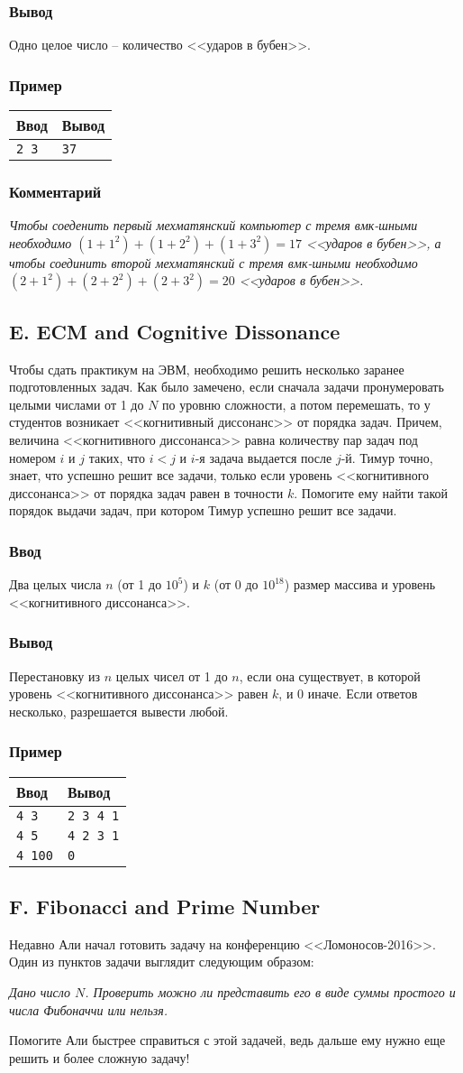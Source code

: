 \documentclass[10pt, a4paper]{article}
\newcommand{\informat}[1]
{
	\subsubsection*{Ввод} #1
}
\newcommand{\outformat}[1]
{
	\subsubsection*{Вывод} #1
}
\newcommand{\example}[2]
{
	\subsubsection*{Пример}
	\noindent
	\begin{center}
	\begin{tabularx}{\linewidth}{|X|X|}
	\hline
	Ввод & Вывод \\
	\hline
	{\tt #1} & {\tt #2}		\\
	\hline
	\end{tabularx}
	\end{center}
}
\newcommand{\exampleee}[6]
{
	\subsubsection*{Пример}
	\noindent
	\begin{center}
	\begin{tabularx}{\linewidth}{|X|X|}
	\hline
	Ввод 	& Вывод  	\\
	\hline
	{\tt #1} & {\tt #2}	\\
	\hline
	{\tt #3} & {\tt #4}	\\
	\hline
	{\tt #5} & {\tt #6}	\\
	\hline
	\end{tabularx}
	\end{center}
}
\newcommand{\excomm}[1]
{
	\subsubsection*{Комментарий}
	\textit{#1}
}
\begin{document}
\outformat{Одно целое число -- количество <<ударов в бубен>>.}

\example{2 3}{37}

\excomm{Чтобы соеденить первый мехматянский компьютер с тремя вмк-шными необходимо $(1+1^2) + (1+2^2) + (1+3^2) = 17$ <<ударов в бубен>>, а чтобы соединить второй мехматянский с тремя вмк-шными необходимо $(2+1^2) + (2+2^2) + (2+3^2) = 20$ <<ударов в бубен>>.}



\subsection*{E. ECM and Cognitive Dissonance}

Чтобы сдать практикум на ЭВМ, необходимо решить несколько заранее подготовленных задач. Как было замечено, если сначала задачи пронумеровать целыми числами от 1 до $N$ по уровню сложности, а потом перемешать, то у студентов возникает <<когнитивный диссонанс>> от порядка задач. Причем, величина <<когнитивного диссонанса>> равна количеству пар задач под номером $i$ и $j$ таких, что $i < j$ и $i$-я задача выдается после $j$-й. Тимур точно, знает, что успешно решит все задачи, только если уровень <<когнитивного диссонанса>> от порядка задач равен в точности $k$. Помогите ему найти такой порядок выдачи задач, при котором Тимур успешно решит все задачи.

\informat{Два целых числа $n$ (от 1 до $10^5$) и $k$ (от 0 до $10^{18}$) размер массива и уровень <<когнитивного диссонанса>>.}

\outformat{Перестановку из $n$ целых чисел от 1 до $n$, если она существует, в которой уровень <<когнитивного диссонанса>> равен $k$, и 0 иначе. Если ответов несколько, разрешается вывести любой.}

\exampleee{4 3}{2 3 4 1}{4 5}{4 2 3 1}{4 100}{0}



\subsection*{F. Fibonacci and Prime Number}

Недавно Али начал готовить задачу на конференцию <<Ломоносов-2016>>. Один из пунктов задачи выглядит следующим образом: 

\textit{Дано число $N$. Проверить можно ли представить его в виде суммы простого и числа Фибоначчи или нельзя.}

Помогите Али быстрее справиться с этой задачей, ведь дальше ему нужно еще решить и более сложную задачу! 
\end{document}
